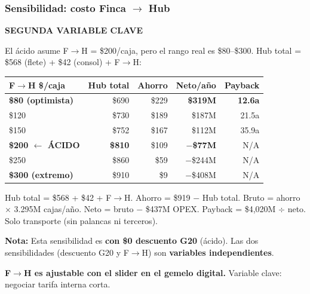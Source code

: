 \documentclass[aspectratio=169, 10pt]{beamer}
\newcommand{\tagline}[2]{{\scriptsize\color{#1}\textbf{\MakeUppercase{#2}}}}
\begin{document}
\begin{frame}
\frametitle{Sensibilidad: costo Finca $\rightarrow$ Hub}
\tagline{amarillo}{Segunda Variable Clave}
\vspace{-2pt}

{\scriptsize El \'acido asume F$\rightarrow$H = \$200/caja, pero el rango real es \$80--\$300. Hub total = \$568 (flete) + \$42 (consol) + F$\rightarrow$H:}

\vspace{3pt}
\begin{center}
\scriptsize
\renewcommand{\arraystretch}{1.05}
\begin{tabular}{l r r r r}
    \toprule
    \textbf{F$\rightarrow$H \$/caja} & \textbf{Hub total} & \textbf{Ahorro} & \textbf{Neto/a\~no} & \textbf{Payback} \\
    \midrule
    \rowcolor{verdeclaro}
    \textcolor{verde}{\textbf{\$80 (optimista)}} & \$690 & \$229 & \textcolor{verde}{\textbf{\$319M}} & \textcolor{verde}{\textbf{12.6a}} \\
    \$120 & \$730 & \$189 & \$187M & 21.5a \\
    \$150 & \$752 & \$167 & \$112M & 35.9a \\
    \rowcolor{rojoclaro}
    \textcolor{rojo}{\textbf{\$200 $\leftarrow$ \'ACIDO}} & \textbf{\$810} & \$109 & \textcolor{rojo}{\textbf{$-$\$77M}} & N/A \\
    \$250 & \$860 & \$59 & $-$\$244M & N/A \\
    \rowcolor{rojoclaro}
    \textcolor{rojo}{\textbf{\$300 (extremo)}} & \$910 & \$9 & $-$\$408M & N/A \\
    \bottomrule
\end{tabular}
\end{center}

\vspace{1pt}
{\tiny\color{gris} Hub total = \$568 + \$42 + F$\rightarrow$H. Ahorro = \$919 $-$ Hub total.
Bruto = ahorro $\times$ 3.295M cajas/a\~no. Neto = bruto $-$ \$437M OPEX.
Payback = \$4,020M $\div$ neto. Solo transporte (sin palancas ni terceros).}

\vspace{4pt}
\colorbox{amarilloclaro}{\parbox{\dimexpr\textwidth-12pt}{\scriptsize\strut
\textcolor{amarillo}{\textbf{Nota:}} Esta sensibilidad es \textbf{con \$0 descuento G20} (\'acido).
Las dos sensibilidades (descuento G20 y F$\rightarrow$H) son \textbf{variables independientes}.\strut}}

\vspace{3pt}
\colorbox{verdeclaro}{\parbox{\dimexpr\textwidth-12pt}{\scriptsize\strut
\textcolor{verde}{}\hspace{2pt}
\textcolor{verde}{\textbf{F$\rightarrow$H es ajustable con el slider en el gemelo digital.}}
Variable clave: negociar tarifa interna corta.\strut}}
\end{frame}
\end{document}
